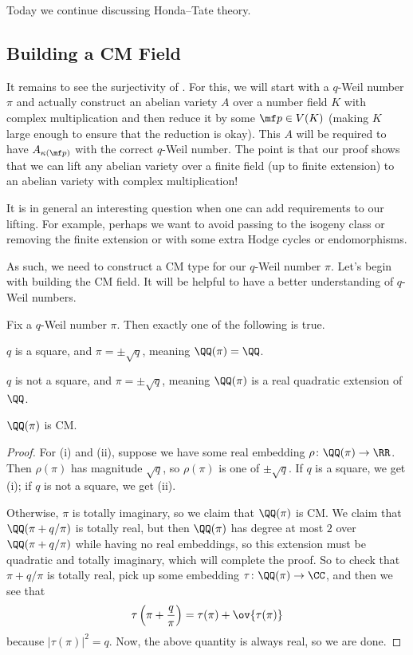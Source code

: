 \documentclass[../notes.tex]{subfiles}
\begin{document}
Today we continue discussing Honda--Tate theory.

\subsection{Building a CM Field}
It remains to see the surjectivity of . For this, we will start with a $q$-Weil number $\pi$ and actually construct an abelian variety $A$ over a number field $K$ with complex multiplication and then reduce it by some $\mf p\in V(K)$ (making $K$ large enough to ensure that the reduction is okay). This $A$ will be required to have $A_{\kappa(\mf p)}$ with the correct $q$-Weil number. The point is that our proof shows that we can lift any abelian variety over a finite field (up to finite extension) to an abelian variety with complex multiplication!
\begin{remark}
	It is in general an interesting question when one can add requirements to our lifting. For example, perhaps we want to avoid passing to the isogeny class or removing the finite extension or with some extra Hodge cycles or endomorphisms.
\end{remark}
As such, we need to construct a CM type for our $q$-Weil number $\pi$. Let's begin with building the CM field. It will be helpful to have a better understanding of $q$-Weil numbers.
\begin{lemma}
	Fix a $q$-Weil number $\pi$. Then exactly one of the following is true.
	\begin{listroman}
		\item $q$ is a square, and $\pi=\pm\sqrt q$, meaning $\QQ(\pi)=\QQ$.
		\item $q$ is not a square, and $\pi=\pm\sqrt q$, meaning $\QQ(\pi)$ is a real quadratic extension of $\QQ$.
		\item $\QQ(\pi)$ is CM.
	\end{listroman}
\end{lemma}
\begin{proof}
	For (i) and (ii), suppose we have some real embedding $\rho\colon\QQ(\pi)\to\RR$. Then $\rho(\pi)$ has magnitude $\sqrt q$, so $\rho(\pi)$ is one of $\pm\sqrt q$. If $q$ is a square, we get (i); if $q$ is not a square, we get (ii).

	Otherwise, $\pi$ is totally imaginary, so we claim that $\QQ(\pi)$ is CM. We claim that $\QQ(\pi+q/\pi)$ is totally real, but then $\QQ(\pi)$ has degree at most $2$ over $\QQ(\pi+q/\pi)$ while having no real embeddings, so this extension must be quadratic and totally imaginary, which will complete the proof. So to check that $\pi+q/\pi$ is totally real, pick up some embedding $\tau\colon\QQ(\pi)\to\CC$, and then we see that
	\[\tau\left(\pi+\frac q\pi\right)=\tau(\pi)+\ov{\tau(\pi)}\]
	because $\left|\tau(\pi)\right|^2=q$. Now, the above quantity is always real, so we are done.
\end{proof}
\end{document}
